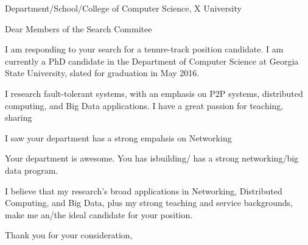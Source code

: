 \documentclass{letter}
\date{}
\begin{document}
 
\begin{letter}{Department/School/College of Computer Science, X University} 
\opening{Dear Members of the Search Commitee} 
 
I am responding to your search for a tenure-track position candidate.
I am currently a PhD candidate in the Department of Computer Science at Georgia State University, slated for graduation in May 2016.


I research fault-tolerant systems, with an emphasis  on P2P systems, distributed computing, and Big Data applications.
I have a great passion for teaching, sharing 

I saw your department has a strong empahsis on Networking

Your department is awesome.
You has isbuilding/ has a strong networking/big data program.



I believe that my research's broad applications in Networking, Distributed Computing, and Big Data, plus my strong teaching and service backgrounds, make me an/the ideal candidate for your position.


\closing{Thank you for your consideration,} 
\end{letter} 
\end{document}

